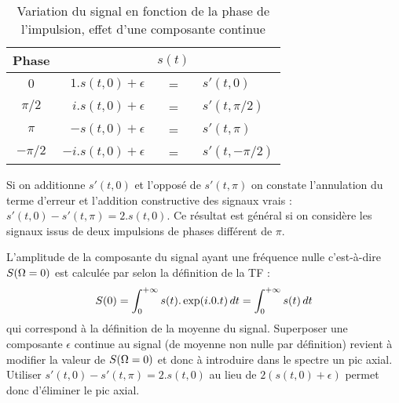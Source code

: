 \begin{table}
\caption{Variation du signal en fonction de la phase de l'impulsion, 
effet d'une composante continue}
\label{tab:phasea}
\begin{center}
\begin{tabular}[hbt]{crcl}
\hline
Phase    &                     & $s(t)$ &          \\ \hline
$0$      &  $1.s(t,0) + \epsilon$ & = & $s'(t,0)$ \\
$\pi/2$  &  $i.s(t,0) + \epsilon$ & = & $s'(t,\pi/2)$ \\
$\pi$    &   $-s(t,0) + \epsilon$ & = & $s'(t,\pi)$ \\
$-\pi/2$ & $-i.s(t,0) + \epsilon$ & = & $s'(t,-\pi/2)$ \\
\hline
\end{tabular}
\end{center}  
\end{table}

Si on additionne $s'(t,0)$ et l'opposé de $s'(t,\pi)$ on constate l'annulation du terme 
d'erreur et l'addition constructive des signaux vrais : 
$s'(t,0) - s'(t,\pi) = 2.s(t,0)$. 
Ce résultat est général si on considère les signaux issus de deux impulsions de 
phases différent de $\pi$.

L'amplitude de la composante du signal ayant une fréquence nulle 
c'est-à-dire $S(\Omega = 0)$ est calculée par selon la définition de la TF : 
\begin{equation}
		S(0) = \int_0^{+\infty} s(t).\exp(i.0.t) \, dt = \int_0^{+\infty} s(t) \, dt
\end{equation}
qui correspond à la définition de la moyenne du signal. 
Superposer une composante $\epsilon$
continue au signal (de moyenne non nulle par définition) 
revient à modifier la valeur de 
$S(\Omega = 0)$ et donc à introduire dans le spectre un pic axial.
Utiliser $s'(t,0) - s'(t,\pi) = 2.s(t,0)$ au lieu
de $2(s(t,0)+\epsilon)$ permet donc d'éliminer le pic axial.


